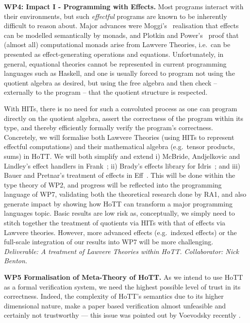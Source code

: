 \documentclass[a4paper,11pt]{article}
\newcommand{\eg}{{e.g.}\ }
\begin{document}
{\bf WP4: Impact I - Programming with Effects.}
Most programs interact with their environments,
but such \emph{effectful} programs are known to be inherently difficult to
reason about.
Major advances were Moggi's~\cite{moggi:monad} realisation that effects can be modelled semantically by monads, and
Plotkin and Power's~\cite{PlotkinPower:Lawvere} proof that (almost
all) computational monads arise from Lawvere Theories, i.e.\ can be
presented as effect-generating operations and equations.
Unfortunately, in general, equational theories cannot be represented
in current programming languages such as Haskell, and one is usually 
forced to program not using the quotient algebra as desired, but
using the free algebra and then check -- externally to the program --
that the quotient structure is respected.  

With HITs, there is no need for such a convoluted process
as one
can program directly on the quotient algebra,
assert the correctness of the program within its type, and thereby 
efficiently formally verify the program's correctness. Concretely, we will formalise both Lawvere
Theories (using HITs to represent effectful computations) and their
mathematical algebra (e.g.\ tensor products, sums) in HoTT.  We will
both simplify and extend i) McBride, Andjelkovic and Lindley's effect
handlers in Frank~\cite{conor:frank}; ii) Brady's effects library for
Idris~\cite{brady:effects}; and iii) Bauer and Pretnar's treatment of
effects in Eff~\cite{bauer:eff}.  This will be done within the type
theory of WP2, and progress will be reflected into the programming
language of WP7, validating both the theoretical research done
by RA1, and also generate impact by showing how HoTT can transform a
major programming languages topic. Basic results are low risk as,
conceptually, we simply need to stitch together the treatment of
quotients via HITs with that of effects via Lawvere theories.
However, more advanced effects (\eg indexed effects) or the full-scale
integration of our results into WP7 will be more challenging. {\em
  Deliverable: A treatment of Lawvere Theories within
  HoTT. Collaborator: Nick Benton.}


{\bf WP5 Formalisation of Meta-Theory of HoTT.}  As we intend to use
HoTT as a formal verification system, we need the highest possible
level of trust in its correctness. Indeed, the complexity of HoTT's
semantics due to its higher dimensional nature, make a paper based
verification almost unfeasible and certainly not trustworthy --- this
issue was pointed out by Voevodsky recently \cite{voevodsky-ias14}.
\end{document}
